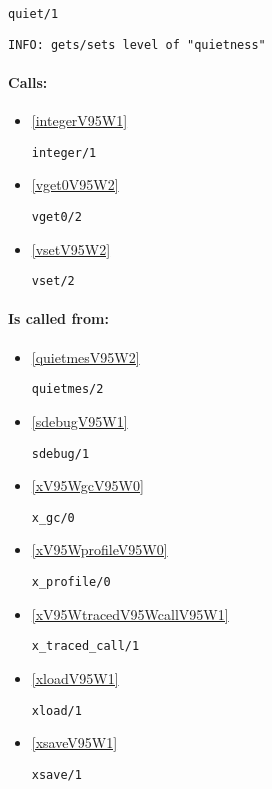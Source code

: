 \begin{verbatim}
quiet/1
\end{verbatim}

{\small \begin{verbatim}
INFO: gets/sets level of "quietness"

\end{verbatim}}
\paragraph{Calls:} 
\begin{itemize}
\item \ref{integerV95W1} 
\begin{verbatim}
integer/1
\end{verbatim}

\item \ref{vget0V95W2} 
\begin{verbatim}
vget0/2
\end{verbatim}

\item \ref{vsetV95W2} 
\begin{verbatim}
vset/2
\end{verbatim}

\end{itemize}
\paragraph{Is called from:} 
\begin{itemize}
\item \ref{quietmesV95W2} 
\begin{verbatim}
quietmes/2
\end{verbatim}

\item \ref{sdebugV95W1} 
\begin{verbatim}
sdebug/1
\end{verbatim}

\item \ref{xV95WgcV95W0} 
\begin{verbatim}
x_gc/0
\end{verbatim}

\item \ref{xV95WprofileV95W0} 
\begin{verbatim}
x_profile/0
\end{verbatim}

\item \ref{xV95WtracedV95WcallV95W1} 
\begin{verbatim}
x_traced_call/1
\end{verbatim}

\item \ref{xloadV95W1} 
\begin{verbatim}
xload/1
\end{verbatim}

\item \ref{xsaveV95W1} 
\begin{verbatim}
xsave/1
\end{verbatim}

\end{itemize}

